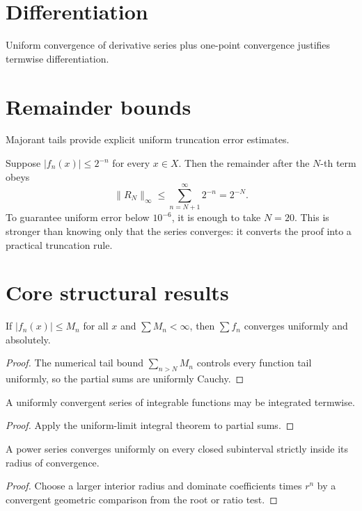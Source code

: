 \section{Differentiation}
Uniform convergence of derivative series plus one-point convergence justifies termwise differentiation.

\section{Remainder bounds}
Majorant tails provide explicit uniform truncation error estimates.


\begin{example}\label{ex:ii13-expand-03}
Suppose \(|f_n(x)|\le2^{-n}\) for every \(x\in X\). Then the remainder after
the \(N\)-th term obeys
\[
\|R_N\|_\infty
\le\sum_{n=N+1}^{\infty}2^{-n}=2^{-N}.
\]
To guarantee uniform error below \(10^{-6}\), it is enough to take \(N=20\).
This is stronger than knowing only that the series converges: it converts the
proof into a practical truncation rule.
\end{example}
\section{Core structural results}

\begin{theorem}\label{thm:ii13-01}
If $|f_n(x)|\le M_n$ for all $x$ and $\sum M_n<\infty$, then $\sum f_n$ converges uniformly and absolutely.
\begin{proof}
The numerical tail bound $\sum_{n>N}M_n$ controls every function tail uniformly, so the partial sums are uniformly Cauchy.
\end{proof}
\end{theorem}

\begin{theorem}\label{thm:ii13-02}
A uniformly convergent series of integrable functions may be integrated termwise.
\begin{proof}
Apply the uniform-limit integral theorem to partial sums.
\end{proof}
\end{theorem}

\begin{theorem}\label{thm:ii13-03}
A power series converges uniformly on every closed subinterval strictly inside its radius of convergence.
\begin{proof}
Choose a larger interior radius and dominate coefficients times $r^n$ by a convergent geometric comparison from the root or ratio test.
\end{proof}
\end{theorem}

